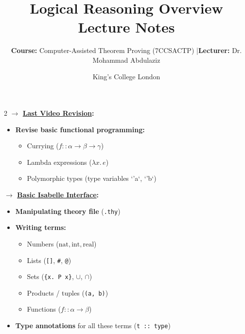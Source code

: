 \documentclass[10pt,a4paper]{article}
\title{\textbf{\huge Logical Reasoning Overview}\\[0.3em]
\large Lecture Notes}
\author{\textbf{Course:} Computer-Assisted Theorem Proving (7CCSACTP) \quad|\quad \textbf{Lecturer:} Dr. Mohammad Abdulaziz}
\date{King's College London}
\begin{document}
\maketitle
\vspace{-1.5em}

\begin{tcolorbox}[title={1. Background \& Functional Programming Revision}]
\begin{multicols}{2}
\textbf{$\rightarrow$ \underline{Last Video Revision}:}
\begin{itemize}[leftmargin=1.2em, itemsep=3pt]
    \item \textbf{Revise basic functional programming:}
    \begin{itemize}[leftmargin=1em, itemsep=1pt]
        \item Currying ($f :: \alpha \to \beta \to \gamma$)
        \item Lambda expressions ($\lambda x.\, e$)
        \item Polymorphic types (type variables `'a`, `'b`)
    \end{itemize}
\end{itemize}

\columnbreak

\textbf{$\rightarrow$ \underline{Basic Isabelle Interface}:}
\begin{itemize}[leftmargin=1.2em, itemsep=3pt]
    \item \textbf{Manipulating theory file} (\texttt{.thy})
    \item \textbf{Writing terms:}
    \begin{itemize}[leftmargin=1em, itemsep=1pt]
        \item Numbers ($\text{nat}, \text{int}, \text{real}$)
        \item Lists (\texttt{[]}, \texttt{\#}, \texttt{@})
        \item Sets (\texttt{\{x. P x\}}, \texttt{$\cup$}, \texttt{$\cap$})
        \item Products / tuples (\texttt{(a, b)})
        \item Functions ($f :: \alpha \to \beta$)
    \end{itemize}
    \item \textbf{Type annotations} for all these terms (\texttt{t :: type})
\end{itemize}
\end{multicols}
\end{tcolorbox}

\vspace{0.3em}
\end{document}
